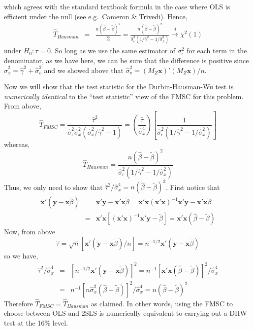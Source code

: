 \documentclass[12pt]{article}
\theoremstyle{definition}
\begin{document}
which agrees with the standard textbook formula in the case where OLS is efficient under the null (see e.g.\ Cameron \& Trivedi). Hence,
  \begin{eqnarray*}
    \widehat{T}_{Hausman} &=& \frac{n(\widehat{\beta} - \widetilde{\beta})^2}{\widehat{\Sigma}} = \frac{n(\widehat{\beta} - \widetilde{\beta})^2}{\widehat{\sigma}_\epsilon^2\left(1/\widehat{\gamma}^2 - 1/\widehat{\sigma}_x^2\right)}\overset{d}{\rightarrow} \chi^2(1)
  \end{eqnarray*}
under $H_0\colon \tau = 0$. So long as we use the same estimator of $\sigma_\epsilon^2$ for each term in the denominator, as we have here, we can be sure that the difference is positive since $\widehat{\sigma}_x^2 = \widehat{\gamma}^2 + \widehat{\sigma}_v^2$ and we showed above that $\widehat{\sigma}_v^2 = (M_Z \mathbf{x})'(M_Z \mathbf{x})/n$.


Now we will show that the test statistic for the Durbin-Hausman-Wu test is \emph{numerically identical} to the ``test statistic'' view of the FMSC for this problem. From above,
  $$\widehat{T}_{FMSC} =  \frac{\widehat{\tau}^2}{ \widehat{\sigma}^2_\epsilon \widehat{\sigma}^2_x \left(\widehat{\sigma}_x^2/\widehat{\gamma}^2 - 1 \right)} = \left(\frac{\widehat{\tau}}{\widehat{\sigma}_x^4}\right)\left[\frac{1}{\widehat{\sigma}_\epsilon^2\left(1/\widehat{\gamma}^2 - 1/\widehat{\sigma}_x^2\right)} \right]$$
whereas,
  $$\widehat{T}_{Hausman} =\frac{n(\widehat{\beta} - \widetilde{\beta})^2}{\widehat{\sigma}_\epsilon^2\left(1/\widehat{\gamma}^2 - 1/\widehat{\sigma}_x^2\right)}$$
  Thus, we only need to show that $\widehat{\tau}^2/\widehat{\sigma}_x^4 = n(\widehat{\beta} - \widetilde{\beta})^2$. First notice that
\begin{eqnarray*}
   \mathbf{x}' \left(\mathbf{y} - \mathbf{x}\widetilde{\beta}\right)&=& \mathbf{x}'\mathbf{y} - \mathbf{x}'\mathbf{x}\widetilde{\beta} =\mathbf{x}'\mathbf{x}\left(\mathbf{x}'\mathbf{x}\right)^{-1} \mathbf{x}'\mathbf{y} - \mathbf{x}'\mathbf{x}\widetilde{\beta}\\
    &=&\mathbf{x}'\mathbf{x}\left[\left(\mathbf{x}'\mathbf{x}\right)^{-1} \mathbf{x}'\mathbf{y} -  \widetilde{\beta}\right] = \mathbf{x}'\mathbf{x} \left( \widehat{\beta} - \widetilde{\beta}\right)
\end{eqnarray*}
Now, from above
  $$\widehat{\tau} = \sqrt{n} \left[\mathbf{x}'(\mathbf{y} - \mathbf{x}\widetilde{\beta})/n\right] = n^{-1/2} \textbf{x}'(\mathbf{y} - \mathbf{x}\widetilde{\beta})$$
so we have,
  \begin{eqnarray*}
    \widehat{\tau}^2/\widehat{\sigma}_x^4 &=&  \left[n^{-1/2} \textbf{x}'(\mathbf{y} - \mathbf{x}\widetilde{\beta})\right]^2 = n^{-1}\left[\mathbf{x}'\mathbf{x} \left( \widehat{\beta} - \widetilde{\beta}\right) \right]^2/\widehat{\sigma}_x^4 \\
      &=& n^{-1}\left[n \widehat{\sigma}_x^2 \left( \widehat{\beta} - \widetilde{\beta}\right) \right]^2/\widehat{\sigma}_x^4  = n\left( \widehat{\beta} - \widetilde{\beta}\right) ^2
  \end{eqnarray*}
  Therefore $\widehat{T}_{FMSC} = \widehat{T}_{Hausman}$ as claimed. In other words, using the FMSC to choose between OLS and 2SLS is numerically equivalent to carrying out a DHW test at the 16\% level.
\end{document}
